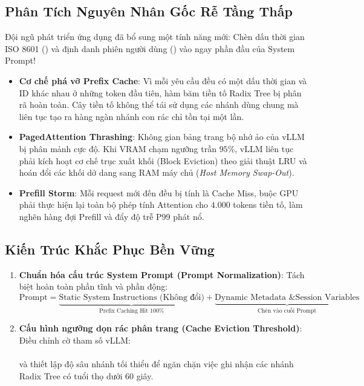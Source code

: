 \subsection{Phân Tích Nguyên Nhân Gốc Rễ Tầng Thấp}
Đội ngũ phát triển ứng dụng đã bổ sung một tính năng mới: Chèn dấu thời gian ISO 8601 () và định danh phiên người dùng () vào ngay phần đầu của System Prompt!
\begin{itemize}
  \item \textbf{Cơ chế phá vỡ Prefix Cache}: Vì mỗi yêu cầu đều có một dấu thời gian và ID khác nhau ở những token đầu tiên, hàm băm tiền tố Radix Tree bị phân rã hoàn toàn. Cây tiền tố không thể tái sử dụng các nhánh dùng chung mà liên tục tạo ra hàng ngàn nhánh con rác chỉ tồn tại một lần.
  \item \textbf{PagedAttention Thrashing}: Không gian bảng trang bộ nhớ ảo của vLLM bị phân mảnh cực độ. Khi VRAM chạm ngưỡng trần $95\%$, vLLM liên tục phải kích hoạt cơ chế trục xuất khối (Block Eviction) theo giải thuật LRU và hoán đổi các khối dở dang sang RAM máy chủ (\textit{Host Memory Swap-Out}).
  \item \textbf{Prefill Storm}: Mỗi request mới đến đều bị tính là Cache Miss, buộc GPU phải thực hiện lại toàn bộ phép tính Attention cho $4.000$ tokens tiền tố, làm nghẽn hàng đợi Prefill và đẩy độ trễ P99 phát nổ.
\end{itemize}

\subsection{Kiến Trúc Khắc Phục Bền Vững}
\begin{enumerate}
  \item \textbf{Chuẩn hóa cấu trúc System Prompt (Prompt Normalization)}: Tách biệt hoàn toàn phần tĩnh và phần động:
  \begin{equation*}
  \text{Prompt} = \underbrace{\text{Static System Instructions (Không đổi)}}_{\text{Prefix Caching Hit 100\%}} + \underbrace{\text{Dynamic Metadata \& Session Variables}}_{\text{Chèn vào cuối Prompt}}
  \end{equation*}
  \item \textbf{Cấu hình ngưỡng dọn rác phân trang (Cache Eviction Threshold)}:
  Điều chỉnh cờ tham số vLLM:\\
  \\
  và thiết lập độ sâu nhánh tối thiểu để ngăn chặn việc ghi nhận các nhánh Radix Tree có tuổi thọ dưới 60 giây.
\end{enumerate}

